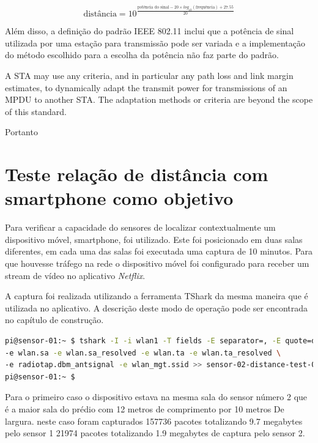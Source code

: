 \begin{equation}
	\text{distância} = 10 ^{ \frac{ \text{potência do sinal} - 20 \times log_{10}\left(\text{frequência}\right)  + 27.55}{20} }
\end{equation}



Além disso, a definição do padrão IEEE 802.11 inclui que a potência de sinal
utilizada por uma estação para transmissão pode ser variada e a implementação
do método escolhido para a escolha da potência não faz parte do padrão.

\begin{citacao}[english]

	A STA may use any criteria, and in particular any path loss and link margin
	estimates, to dynamically adapt the transmit power for transmissions of an
	MPDU to another STA. The adaptation methods or criteria are beyond the scope
	of this standard. \

\end{citacao}

Portanto


\clearpage
\section{Teste relação de distância com smartphone como objetivo}
\label{sec:teste-smarphone}

Para verificar a capacidade do sensores de localizar contextualmente um
dispositivo móvel, smartphone, foi utilizado. Este foi posicionado em duas salas
diferentes, em cada uma das salas foi executada uma captura de 10 minutos. Para
que houvesse tráfego na rede o dispositivo móvel foi configurado para receber um
stream de vídeo no aplicativo \emph{Netflix}.

A captura foi realizada utilizando a ferramenta TShark da mesma maneira que é utilizada no
aplicativo. A descrição deste modo de operação pode ser encontrada no capítulo de construção.

\begin{lstlisting}[language=bash,caption={TShark e redirecionamento da saída para arquivo},label=code-tshark-pipe]
pi@sensor-01:~ $ tshark -I -i wlan1 -T fields -E separator=, -E quote=d \
-e wlan.sa -e wlan.sa_resolved -e wlan.ta -e wlan.ta_resolved \
-e radiotap.dbm_antsignal -e wlan_mgt.ssid >> sensor-02-distance-test-01.csv
pi@sensor-01:~ $
\end{lstlisting}

Para o primeiro caso o dispositivo estava na mesma sala do sensor número 2 que é a maior
sala do prédio com 12  metros de comprimento por 10 metros  De largura. neste caso foram
capturados 157736 pacotes totalizando 9.7 megabytes pelo sensor 1 21974 pacotes totalizando
1.9 megabytes de captura pelo sensor 2.

